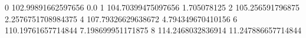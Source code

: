 0 102.99891662597656 0.0
1 104.70399475097656 1.705078125
2 105.256591796875 2.2576751708984375
4 107.79326629638672 4.794349670410156
6 110.19761657714844 7.198699951171875
8 114.2468032836914 11.247886657714844
